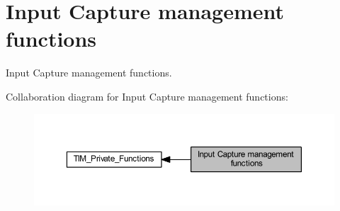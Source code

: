 \hypertarget{group___t_i_m___group3}{}\section{Input Capture management functions}
\label{group___t_i_m___group3}


Input Capture management functions.  


Collaboration diagram for Input Capture management functions\+:\nopagebreak
\begin{figure}[H]
\begin{center}
\leavevmode
\includegraphics[width=350pt]{group___t_i_m___group3}
\end{center}
\end{figure}
